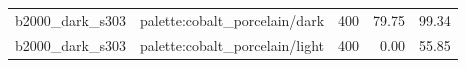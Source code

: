 \begin{longtable}{l>{\raggedright\arraybackslash}p{.42\linewidth}rrr}
b2000\_\allowbreak{}dark\_\allowbreak{}s303 & %
palette:cobalt\_\allowbreak{}porcelain/dark & %
400 & %
79.75 & %
99.34 \\ %

b2000\_\allowbreak{}dark\_\allowbreak{}s303 & %
palette:cobalt\_\allowbreak{}porcelain/light & %
400 & %
0.00 & %
55.85 \\ %


\end{longtable}
